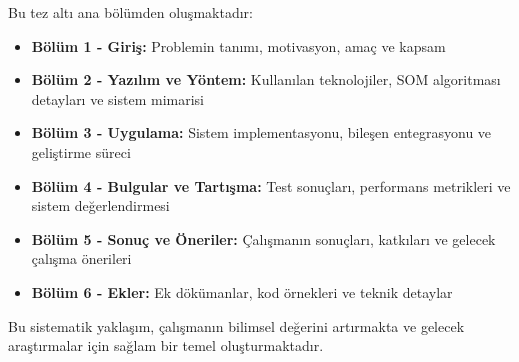 Bu tez altı ana bölümden oluşmaktadır:

\begin{itemize}
    \item \textbf{Bölüm 1 - Giriş:} Problemin tanımı, motivasyon, amaç ve kapsam
    \item \textbf{Bölüm 2 - Yazılım ve Yöntem:} Kullanılan teknolojiler, SOM algoritması detayları ve sistem mimarisi
    \item \textbf{Bölüm 3 - Uygulama:} Sistem implementasyonu, bileşen entegrasyonu ve geliştirme süreci
    \item \textbf{Bölüm 4 - Bulgular ve Tartışma:} Test sonuçları, performans metrikleri ve sistem değerlendirmesi
    \item \textbf{Bölüm 5 - Sonuç ve Öneriler:} Çalışmanın sonuçları, katkıları ve gelecek çalışma önerileri
    \item \textbf{Bölüm 6 - Ekler:} Ek dökümanlar, kod örnekleri ve teknik detaylar
\end{itemize}

Bu sistematik yaklaşım, çalışmanın bilimsel değerini artırmakta ve gelecek araştırmalar için sağlam bir temel oluşturmaktadır.
